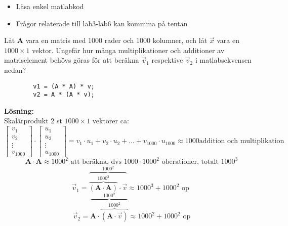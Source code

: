 \begin{itemize}
    \item Läsa enkel matlabkod
    \item Frågor relaterade till lab3-lab6 kan kommma på tentan
\end{itemize}
\begin{Ex}
    Låt \textbf{A} vara en matris med 1000 rader och 1000 kolumner, och låt $\vec{x}$ vara en $1000 \times 1$ vektor. Ungefär hur många multiplikationer och additioner av matriselement behövs göras för att beräkna $\vec{v}_1$ respektive $\vec{v}_2$ i matlabsekvensen nedan?\\
    \begin{lstlisting}
        v1 = (A * A) * v;
        v2 = A * (A * v);
    \end{lstlisting}
    \textbf{Lösning: }\\
    Skalärprodukt 2 st $1000 \times 1$ vektorer ca:
    \[
        \begin{bmatrix}
            v_1\\
            v_2\\
            \vdots\\
            v_{1000}
        \end{bmatrix}
        \cdot
        \begin{bmatrix}
            u_1\\
            u_2\\
            \vdots\\
            u_{1000}
        \end{bmatrix}
         = v_1 \cdot u_1 + v_2 \cdot u_2 + ... + v_{1000} \cdot u_{1000} \approx 1000 \mbox{addition och multiplikation}
    \]
    \[
        \mathbf{A} \cdot \mathbf{A} \approx 1000^2 \mbox{ att beräkna, dvs } 1000 \cdot 1000^2 \mbox{ oberationer, totalt } 1000^3
    \]
    \[
        \vec{v}_1 = \overbrace{\overbrace{(\mathbf{A} \cdot \mathbf{A})}^{1000^3} \cdot \vec{v}}^{1000^2} \approx 1000^3 + 1000^2 \mbox{ op }
    \]
    \[
        \vec{v}_2 = \overbrace{\mathbf{A} \cdot \overbrace{(\mathbf{A} \cdot \vec{v})}^{1000^2}}^{1000^2} \approx 1000^2 + 1000^2 \mbox{ op}
    \]

\end{Ex}
